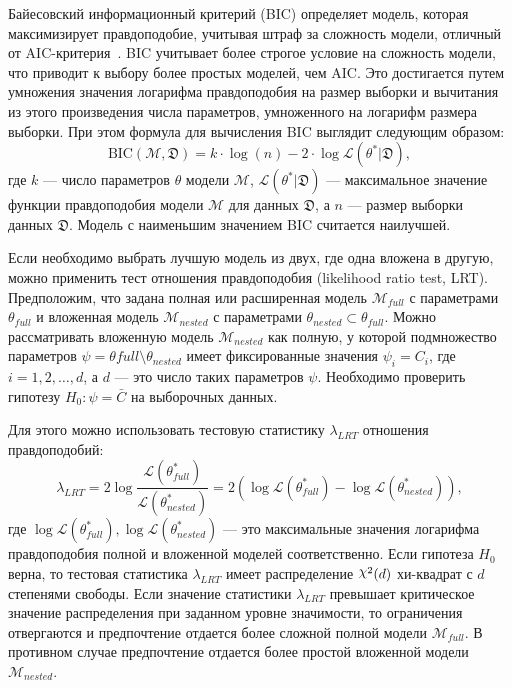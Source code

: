 Байесовский информационный критерий (BIC) определяет модель, которая максимизирует правдоподобие, учитывая штраф за сложность модели, отличный от AIC-критерия~\cite{schwarz1978estimating}.
BIC учитывает более строгое условие на сложность модели, что приводит к выбору более простых моделей, чем AIC.
Это достигается путем умножения значения логарифма правдоподобия на размер выборки и вычитания из этого произведения числа параметров, умноженного на логарифм размера выборки. 
При этом формула для вычисления BIC выглядит следующим образом:
$$\textrm{BIC}(\mathcal{M},\mathfrak{D}) =  k \cdot \log(n) - 2 \cdot \log \mathcal{L}(\theta^* | \mathfrak{D}),$$
где $k$ --- число параметров $\theta$ модели $\mathcal{M}$, $\mathcal{L}(\theta^* | \mathfrak{D})$ --- максимальное значение функции правдоподобия модели $\mathcal{M}$ для данных $\mathfrak{D}$, а $n$ --- размер выборки данных $\mathfrak{D}$.
Модель с наименьшим значением BIC считается наилучшей.

Если необходимо выбрать лучшую модель из двух, где одна вложена в другую, можно применить тест отношения правдоподобия (likelihood ratio test, LRT).
Предположим, что задана полная или расширенная модель $\mathcal{M}_{full}$ с параметрами $\theta_{full}$ и вложенная модель $\mathcal{M}_{nested}$ с параметрами $\theta_{nested} \subset \theta_{full}$.
Можно рассматривать вложенную модель $\mathcal{M}_{nested}$ как полную, у которой подмножество параметров $\psi = \theta{full} \setminus \theta_{nested}$ имеет фиксированные значения $\psi_i = C_i$, где $i = 1, 2, \dots, d$, а $d$ --- это число таких параметров $\psi$.
Необходимо проверить гипотезу $H_0: \psi = \bar{C}$ на выборочных данных.

Для этого можно использовать тестовую статистику $\lambda_{LRT}$ отношения правдоподобий:
$$\lambda_{LRT} = 2\log\frac{\mathcal{L}(\theta^*_{full})}{\mathcal{L}(\theta^*_{nested})} = 2(\log\mathcal{L}(\theta^*_{full}) - \log\mathcal{L}(\theta^*_{nested} )),$$
где $\log\mathcal{L}(\theta^*_{full}), \log\mathcal{L}(\theta^*_{nested})$ --- это максимальные значения логарифма правдоподобия полной и вложенной моделей соответственно.
Если гипотеза $H_0$ верна, то тестовая статистика $\lambda_{LRT}$ имеет распределение $\rchi^{2}(d)$ хи-квадрат с $d$ степенями свободы.
Если значение статистики $\lambda_{LRT}$ превышает критическое значение распределения при заданном уровне значимости, то ограничения отвергаются и предпочтение отдается более сложной полной модели $\mathcal{M}_{full}$.
В противном случае предпочтение отдается более простой вложенной модели $\mathcal{M}_{nested}$.





